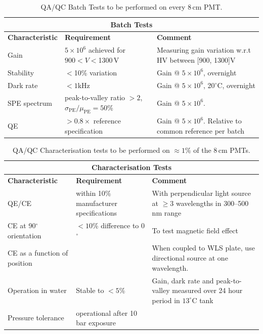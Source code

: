 \documentclass[12pt,a4paper]{article}
\begin{document}
\begin{table}[!htb]
\begin{center}
\begin{tabular}{p{4cm}|p{4cm}|p{5cm}}
\hline
\multicolumn{3}{c}{{\bf Batch Tests}}\\\hline
{\bf Characteristic}  & {\bf Requirement}   & {\bf Comment }\\ \hline
Gain 	& $5 \times 10^6$ achieved for $900<V<$1300\,V 	& Measuring gain variation w.r.t HV between [900, 1300]V  \\ \hline
Stability 	& $<$10\% variation 	& Gain @ $5 \times 10^6$, overnight \\ \hline
Dark rate 	& $<1$kHz 	& Gain @ $5 \times 10^6$, 20$^\circ$C, overnight\\ \hline
SPE spectrum & peak-to-valley ratio $>2$, $\sigma_\text{PE} / \mu_\text{PE} = 50\%$ & Gain @ $5 \times 10^6$.\\ \hline
QE & $>0.8\times$ reference specification & Gain @ $5 \times 10^6$. Relative to common reference per batch \\ \hline
\end{tabular}
\caption{\label{tab:PMTbatchtests} QA/QC Batch Tests to be performed on every 8\,cm PMT.}
\end{center}
\label{tab-PMTQA_all}
\end{table}%

\begin{table}[!htb]
\begin{center}
\begin{tabular}{p{4cm}|p{4cm}|p{5cm}}\hline
\multicolumn{3}{c}{{\bf Characterisation Tests}}\\\hline
\hline
{\bf Characteristic}  & {\bf Requirement}   & {\bf Comment }\\ \hline
QE/CE & within 10\% manufacturer specifications & With perpendicular light source at $\ge3$ wavelengths in 300--500\,nm range\\ \hline
CE at 90$^\circ$ orientation& $<10$\% difference to 0$^\circ$& To test magnetic field effect\\ \hline
CE as a function of position & & When coupled to WLS plate, use directional source at one wavelength. \\ \hline
Operation in water & Stable to $<5$\%  & Gain, dark rate and peak-to-valley measured over 24 hour period in $13^\circ$C tank \\ \hline 
Pressure tolerance & operational after 10\,bar exposure & \\ \hline 
\end{tabular}
\caption{\label{tab:PMTchartests}QA/QC Characterisation tests to be performed on $\approx 1$\% of the 8\,cm PMTs.}
\end{center}
\label{tab:PMTQA_1percent}
\end{table}%
\end{document}

